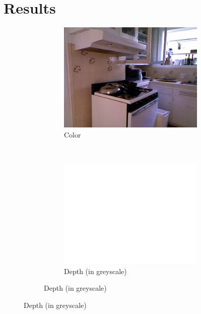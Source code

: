 
\section{Results}
\label{sec:results}

\begin{figure}[t]
\begin{subfigure}{\textwidth}
    \centering
    \begin{subfigure}[t]{0.5\textwidth}
        \centering
        \includegraphics[height=.7\textwidth]{figs/Original321.png}
        \caption{Color}
        \label{fig:original:color}
    \end{subfigure}%
    ~ 
    \begin{subfigure}[t]{0.5\textwidth}
        \centering
        \includegraphics[height=.7\textwidth]{figs/Depth321.png}
        \caption{Depth (in greyscale)}
        \label{fig:original:depth}
    \end{subfigure}
\end{subfigure}


\end{figure}
